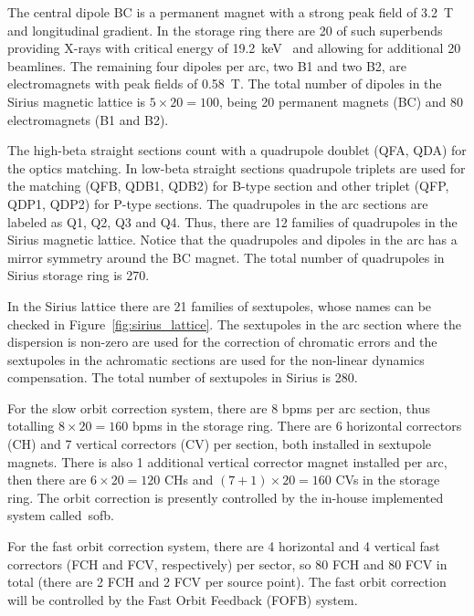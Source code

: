 The central dipole BC is a permanent magnet with a strong peak field of \SI{3.2}{\tesla} and longitudinal gradient. In the storage ring there are 20 of such superbends providing X-rays with critical energy of \SI{19.2}{\kilo\electronvolt}~\cite{Liu2016b} and allowing for additional 20 beamlines. The remaining four dipoles per arc, two B1 and two B2, are electromagnets with peak fields of \SI{0.58}{\tesla}. The total number of dipoles in the Sirius magnetic lattice is $5 \times 20 = 100$, being 20 permanent magnets (BC) and 80 electromagnets (B1 and B2).

The high-beta straight sections count with a quadrupole doublet (QFA, QDA) for the optics matching. In low-beta straight sections quadrupole triplets are used for the matching (QFB, QDB1, QDB2) for B-type section and other triplet (QFP, QDP1, QDP2) for P-type sections. The quadrupoles in the arc sections are labeled as Q1, Q2, Q3 and Q4. Thus, there are 12 families of quadrupoles in the Sirius magnetic lattice. Notice that the quadrupoles and dipoles in the arc has a mirror symmetry around the BC magnet. The total number of quadrupoles in Sirius storage ring is 270. 

In the Sirius lattice there are 21 families of sextupoles, whose names can be checked in Figure~\ref{fig:sirius_lattice}. The sextupoles in the arc section where the dispersion is non-zero are used for the correction of chromatic errors and the sextupoles in the achromatic sections are used for the non-linear dynamics compensation. The total number of sextupoles in Sirius is 280.

For the slow orbit correction system, there are 8 \glspl{bpm} per arc section, thus totalling $8 \times 20 = 160$ \glspl{bpm} in the storage ring. There are 6 horizontal correctors (CH) and 7 vertical correctors (CV) per section, both installed in sextupole magnets. There is also 1 additional vertical corrector magnet installed per arc, then there are $6 \times 20 = 120$ CHs and $(7 + 1) \times 20 = 160$ CVs in the storage ring. The orbit correction is presently controlled by the in-house implemented system called~\gls{sofb}.

For the fast orbit correction system, there are 4 horizontal and 4 vertical fast correctors (FCH and FCV, respectively) per sector, so 80 FCH and 80 FCV in total (there are 2 FCH and 2 FCV per source point). The fast orbit correction will be controlled by the Fast Orbit Feedback (FOFB) system.

